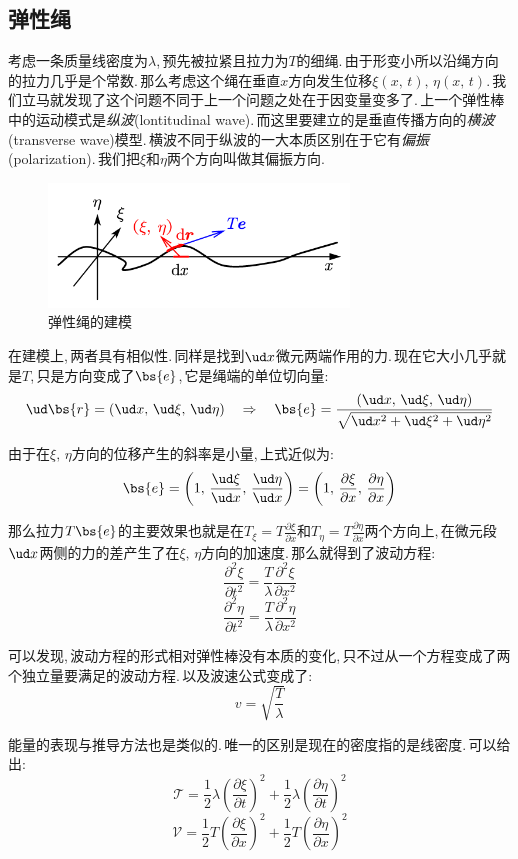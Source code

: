\subsection{弹性绳}
考虑一条质量线密度为$\lambda$,\,预先被拉紧且拉力为$T$的细绳.\,由于形变小所以沿绳方向的拉力几乎是个常数.\,那么考虑这个绳在垂直$x$方向发生位移$\xi(x,\,t),\,\eta(x,\,t)$.\,我们立马就发现了这个问题不同于上一个问题之处在于因变量变多了.\,上一个弹性棒中的运动模式是\emph{纵波}(lontitudinal wave).\,而这里要建立的是垂直传播方向的\emph{横波}(transverse wave)模型.\,横波不同于纵波的一大本质区别在于它有\emph{偏振}(polarization).\,我们把$\xi$和$\eta$两个方向叫做其偏振方向.
\begin{figure}[H]
\centering
\includegraphics[width=8cm]{image/6-7-5.png}
\caption{弹性绳的建模}
\end{figure}

在建模上,\,两者具有相似性.\,同样是找到$\ud x$微元两端作用的力.\,现在它大小几乎就是$T$,\,只是方向变成了$\bs{e}$,\,它是绳端的单位切向量:
\[\ud\bs{r}=(\ud x,\,\ud \xi,\,\ud \eta)\quad\Rightarrow \quad \bs{e}=\frac{(\ud x,\,\ud \xi,\,\ud \eta)}{\sqrt{\ud x^2+\ud \xi^2+\ud \eta^2}}\]

由于在$\xi,\,\eta$方向的位移产生的斜率是小量,\,上式近似为:
\[\bs{e}=\left(1,\,\frac{\ud \xi}{\ud x},\,\frac{\ud \eta}{\ud x}\right )=\left(1,\,\frac{\partial \xi}{\partial x},\,\frac{\partial \eta}{\partial x}\right )\]

那么拉力$T\bs{e}$的主要效果也就是在$T_\xi=T\frac{\partial \xi}{\partial x}$和$T_\eta=T\frac{\partial \eta}{\partial x}$两个方向上,\,在微元段$\ud x$两侧的力的差产生了在$\xi,\,\eta$方向的加速度.\,那么就得到了波动方程:
\[\frac{\partial^2 \xi}{\partial t^2}=\frac{T}{\lambda} \frac{\partial^2 \xi}{\partial x^2}\]
\[\frac{\partial^2 \eta}{\partial t^2}=\frac{T}{\lambda} \frac{\partial^2 \eta}{\partial x^2}\]

可以发现,\,波动方程的形式相对弹性棒没有本质的变化,\,只不过从一个方程变成了两个独立量要满足的波动方程.\,以及波速公式变成了:
\[v=\sqrt{\frac{T}{\lambda}}\]

能量的表现与推导方法也是类似的.\,唯一的区别是现在的密度指的是线密度.\,可以给出:
\[\mathscr{T}=\frac{1}{2}\lambda\left(\frac{\partial \xi}{\partial t}\right)^2+\frac{1}{2}\lambda\left(\frac{\partial \eta}{\partial t}\right)^2\]
\[\mathscr{V}=\frac{1}{2}T\left(\frac{\partial \xi}{\partial x}\right)^2+\frac{1}{2}T\left(\frac{\partial \eta}{\partial x}\right)^2\]

